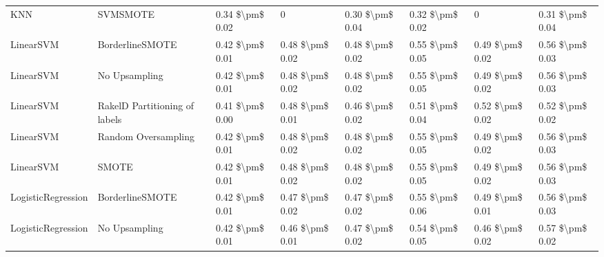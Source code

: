 \begin{tabular}{llllllll}
                            KNN &                      SVMSMOTE & 0.34 \$\textbackslash pm\$ 0.02 &                         0 &       0.30 \$\textbackslash pm\$ 0.04 &        0.32 \$\textbackslash pm\$ 0.02 &                                       0 &     0.31 \$\textbackslash pm\$ 0.04 \\
                      LinearSVM &               BorderlineSMOTE & 0.42 \$\textbackslash pm\$ 0.01 &           0.48 \$\textbackslash pm\$ 0.02 &       0.48 \$\textbackslash pm\$ 0.02 &        0.55 \$\textbackslash pm\$ 0.05 &                         0.49 \$\textbackslash pm\$ 0.02 &     0.56 \$\textbackslash pm\$ 0.03 \\
                      LinearSVM &                 No Upsampling & 0.42 \$\textbackslash pm\$ 0.01 &           0.48 \$\textbackslash pm\$ 0.02 &       0.48 \$\textbackslash pm\$ 0.02 &        0.55 \$\textbackslash pm\$ 0.05 &                         0.49 \$\textbackslash pm\$ 0.02 &     0.56 \$\textbackslash pm\$ 0.03 \\
                      LinearSVM & RakelD Partitioning of labels & 0.41 \$\textbackslash pm\$ 0.00 &           0.48 \$\textbackslash pm\$ 0.01 &       0.46 \$\textbackslash pm\$ 0.02 &        0.51 \$\textbackslash pm\$ 0.04 &                         0.52 \$\textbackslash pm\$ 0.02 &     0.52 \$\textbackslash pm\$ 0.02 \\
                      LinearSVM &           Random Oversampling & 0.42 \$\textbackslash pm\$ 0.01 &           0.48 \$\textbackslash pm\$ 0.02 &       0.48 \$\textbackslash pm\$ 0.02 &        0.55 \$\textbackslash pm\$ 0.05 &                         0.49 \$\textbackslash pm\$ 0.02 &     0.56 \$\textbackslash pm\$ 0.03 \\
                      LinearSVM &                         SMOTE & 0.42 \$\textbackslash pm\$ 0.01 &           0.48 \$\textbackslash pm\$ 0.02 &       0.48 \$\textbackslash pm\$ 0.02 &        0.55 \$\textbackslash pm\$ 0.05 &                         0.49 \$\textbackslash pm\$ 0.02 &     0.56 \$\textbackslash pm\$ 0.03 \\
             LogisticRegression &               BorderlineSMOTE & 0.42 \$\textbackslash pm\$ 0.01 &           0.47 \$\textbackslash pm\$ 0.02 &       0.47 \$\textbackslash pm\$ 0.02 &        0.55 \$\textbackslash pm\$ 0.06 &                         0.49 \$\textbackslash pm\$ 0.01 &     0.56 \$\textbackslash pm\$ 0.03 \\
             LogisticRegression &                 No Upsampling & 0.42 \$\textbackslash pm\$ 0.01 &           0.46 \$\textbackslash pm\$ 0.01 &       0.47 \$\textbackslash pm\$ 0.02 &        0.54 \$\textbackslash pm\$ 0.05 &                         0.46 \$\textbackslash pm\$ 0.02 &     0.57 \$\textbackslash pm\$ 0.02 \\

\end{tabular}
